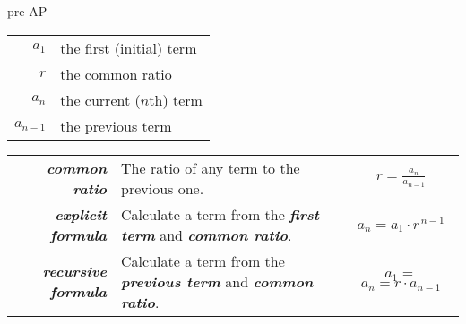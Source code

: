 \begin{taggedblock}{pre-AP}
    \begin{center}
        \begin{tcolorbox}[width=4in]
            \centering
            {
                \large
                \begin{tabular}{r|l}
                    $a_1$ & the first (initial) term \\
                    $r$ & the common ratio \\
                    $a_{n}$ & the current ($n$th) term \\
                    $a_{n-1}$ & the previous term \\
                \end{tabular}
            }
        \end{tcolorbox}
    \end{center}
    \begin{tcolorbox}
        \centering
        {
            \renewcommand{\arraystretch}{2}
            \begin{tabular}{|r|p{3in}|c|}
                \hline
                {\large\bfseries\itshape common ratio}
                    & The ratio of any term to the previous one.
                    & {\large $r = \frac{a_n}{a_{n-1}}$ }
                    \\
                {\large\bfseries\itshape explicit formula}
                    & Calculate a term from the {\bfseries\itshape first term} and {\bfseries\itshape common ratio}.
                    & {$a_n = a_1 \cdot r^{\,n-1}$ }
                    \\
                {\large\bfseries\itshape recursive formula}
                    & Calculate a term from the {\bfseries\itshape previous term} and {\bfseries\itshape common ratio}.
                    & 
                        $a_1 = $\underline{\phantom{99999}}
                        \quad
                        $a_n = r \cdot a_{n-1}$
                    \\
                \hline
            \end{tabular}
        }
    \end{tcolorbox}
\end{taggedblock}

